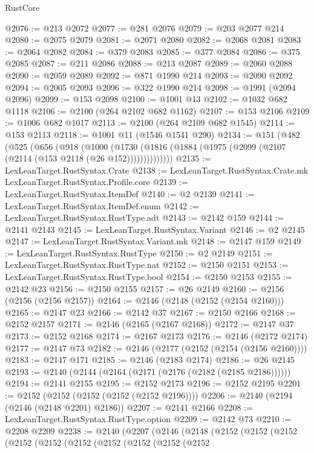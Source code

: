 \begin{lexlean}{RustCore}
\begin{coremodule}
@2076 := @213 @2072
@2077 := @281 @2076
@2079 := @203 @2077 @214
@2080 := @2075 @2079
@2081 := @2071 @2080
@2082 := @2068 @2081
@2083 := @2064 @2082
@2084 := @379 @2083
@2085 := @377 @2084
@2086 := @375 @2085
@2087 := @211 @2086
@2088 := @213 @2087
@2089 := @2060 @2088
@2090 := @2059 @2089
@2092 := @871 @1990 @214
@2093 := @2090 @2092
@2094 := @2005 @2093
@2096 := @322 @1990 @214
@2098 := @1991 (@2094 @2096)
@2099 := @153 @2098
@2100 := @1001 @13
@2102 := @1032 @682 @1118
@2106 := @2100 (@264 @2102 @682 @1162)
@2107 := @153 @2106
@2109 := @1006 @682 @1017
@2113 := @2100 (@264 @2109 @682 @1545)
@2114 := @153 @2113
@2118 := @1001 @11 (@1546 @1541 @290)
@2134 := @151
    (@482
      (@525
        (@656
          (@918
            (@1000
              (@1730 (@1816 (@1884 (@1975 (@2099 (@2107 (@2114 (@153 @2118 (@26 @152))))))))))))))
@2135 := LexLeanTarget.RustSyntax.Crate
@2138 := LexLeanTarget.RustSyntax.Crate.mk LexLeanTarget.RustSyntax.Profile.core
@2139 := LexLeanTarget.RustSyntax.ItemDef
@2140 := @2 @2139
@2141 := LexLeanTarget.RustSyntax.ItemDef.enum
@2142 := LexLeanTarget.RustSyntax.RustType.adt
@2143 := @2142 @159
@2144 := @2141 @2143
@2145 := LexLeanTarget.RustSyntax.Variant
@2146 := @2 @2145
@2147 := LexLeanTarget.RustSyntax.Variant.mk
@2148 := @2147 @159
@2149 := LexLeanTarget.RustSyntax.RustType
@2150 := @2 @2149
@2151 := LexLeanTarget.RustSyntax.RustType.nat
@2152 := @2150 @2151
@2153 := LexLeanTarget.RustSyntax.RustType.bool
@2154 := @2150 @2153
@2155 := @2142 @23
@2156 := @2150 @2155
@2157 := @26 @2149
@2160 := @2156 (@2156 (@2156 @2157))
@2164 := @2146 (@2148 (@2152 (@2154 @2160)))
@2165 := @2147 @23
@2166 := @2142 @37
@2167 := @2150 @2166
@2168 := @2152 @2157
@2171 := @2146 (@2165 (@2167 @2168))
@2172 := @2147 @37
@2173 := @2152 @2168
@2174 := @2167 @2173
@2176 := @2146 (@2172 @2174)
@2177 := @2147 @73
@2182 := @2146 (@2177 (@2152 (@2154 (@2156 @2160))))
@2183 := @2147 @171
@2185 := @2146 (@2183 @2174)
@2186 := @26 @2145
@2193 := @2140 (@2144 (@2164 (@2171 (@2176 (@2182 (@2185 @2186))))))
@2194 := @2141 @2155
@2195 := @2152 @2173
@2196 := @2152 @2195
@2201 := @2152 (@2152 (@2152 (@2152 (@2152 @2196))))
@2206 := @2140 (@2194 (@2146 (@2148 @2201) @2186))
@2207 := @2141 @2166
@2208 := LexLeanTarget.RustSyntax.RustType.option
@2209 := @2142 @73
@2210 := @2208 @2209
@2238 := @2140
    (@2207
      (@2146
        (@2148
          (@2152
            (@2152
              (@2152
                (@2152
                  (@2152
                    (@2152
                      (@2152
                        (@2152
                          (@2152
                            (@2152

\end{coremodule}
\end{lexlean}
